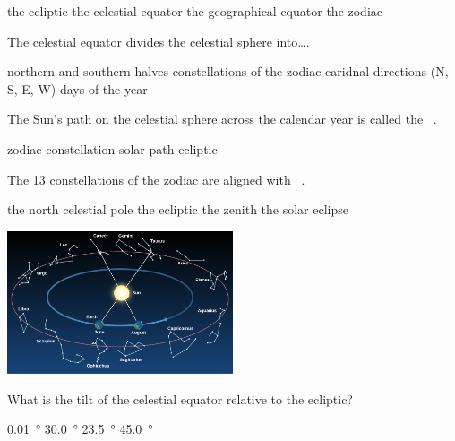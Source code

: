 \documentclass[addpoints]{exam}
\begin{document}
\begin{questions}
\begin{choices}
    \choice the ecliptic
    \correctchoice the celestial equator
    \choice the geographical equator
    \choice the zodiac
\end{choices}

\question
The celestial equator divides the celestial sphere into\dots.

\begin{choices}
     northern and southern halves
     constellations of the zodiac
     caridnal directions (N, S, E, W)
     days of the year
\end{choices}

\question
The Sun's path on the celestial sphere across the calendar year is called the \fillin\ .

\begin{choices}
\choice zodiac
\choice constellation
\choice solar path
\correctchoice ecliptic
\end{choices}

\question
The 13 constellations of the zodiac are aligned with \fillin \ .

\begin{minipage}{0.3\textwidth}
    \centering
    \begin{choices}
    \choice the north celestial pole
    \correctchoice the ecliptic
    \choice the zenith
    \choice the solar eclipse
    \end{choices}
\end{minipage}%
\begin{minipage}{0.6\textwidth}
    \centering
    \includegraphics[width=0.5\textwidth]{Figures/Figure2.6.jpg}
\end{minipage}
\vspace{1em}

\question
What is the tilt of the celestial equator relative to the ecliptic?

\begin{minipage}{0.3\textwidth}
    \centering
    \begin{choices}
    \choice \SI{0.01}{\degree} 
    \choice \SI{30.0}{\degree} 
    \correctchoice \SI{23.5}{\degree} 
    \choice \SI{45.0}{\degree} 
    \end{choices}
\end{minipage}%
\begin{minipage}{0.6\textwidth}
    \centering
\scalebox{0.8}{
\centering
\begin{tikzpicture}


\end{tikzpicture}}
\end{minipage}
\end{questions}
\end{document}
